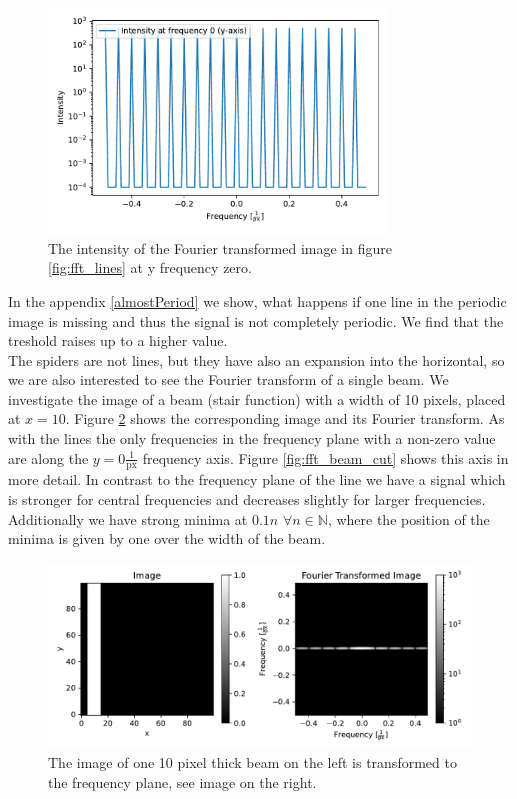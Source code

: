 \begin{figure}[H]
	\centering
		\includegraphics[width=0.8\textwidth]{pics/fft_simulation_cutmorelines.pdf}
		\caption{The intensity of the Fourier transformed image in figure \ref{fig:fft_lines} at y frequency zero.}
		\label{fig:fft_lines_cut}
\end{figure}
In the appendix \ref{almostPeriod} we show, what happens if one line in the periodic image is missing and thus the signal is not completely periodic. We find that the treshold raises up to a higher value.\\
The spiders are not lines, but they have also an expansion into the horizontal, so we are also interested to see the Fourier transform of a single beam. We investigate the image of a beam (stair function) with a width of 10 pixels, placed at $x=10$. Figure \ref{fig:fft_beam} shows the corresponding image and its Fourier transform. As with the lines the only frequencies in the frequency plane with a non-zero value are along the $y=0 \frac{1}{\mathrm{px}}$ frequency axis. Figure \ref{fig:fft_beam_cut} shows this axis in more detail. In contrast to the frequency plane of the line we have a signal which is stronger for central frequencies and decreases slightly for larger frequencies. Additionally we have strong minima at $0.1 n$ $\forall n \in \mathbb{N}$, where the position of the minima is given by one over the width of the beam.
\begin{figure}[H]
	\centering
		\includegraphics[width=1.0\textwidth]{pics/fft_simulationonebeam.pdf}
		\caption{The image of one 10 pixel thick beam on the left is transformed to the frequency plane, see image on the right.}
		\label{fig:fft_beam}
\end{figure}
